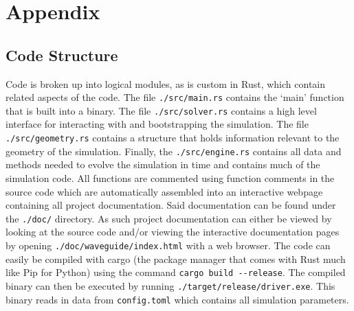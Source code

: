 \section{Appendix}
\label{sec:Appendix}

\subsection{Code Structure}
\label{subsec:code}
Code is broken up into logical modules, as is custom in Rust, which contain related aspects of the code. The file \verb|./src/main.rs| contains the `main' function that is built into a binary. The file \verb|./src/solver.rs| contains a high level interface for interacting with and bootstrapping the simulation. The file \verb|./src/geometry.rs| contains a structure that holds information relevant to the geometry of the simulation. Finally, the \verb|./src/engine.rs| contains all data and methods needed to evolve the simulation in time and contains much of the simulation code. All functions are commented using function comments in the source code which are automatically assembled into an interactive webpage containing all project documentation. Said documentation can be found under the \verb|./doc/| directory. As such project documentation can either be viewed by looking at the source code and/or viewing the interactive documentation pages by opening \verb|./doc/waveguide/index.html| with a web browser. The code can easily be compiled with cargo (the package manager that comes with Rust much like Pip for Python) using the command \verb|cargo build --release|. The compiled binary can then be executed by running \verb|./target/release/driver.exe|. This binary reads in data from \verb|config.toml| which contains all simulation parameters.